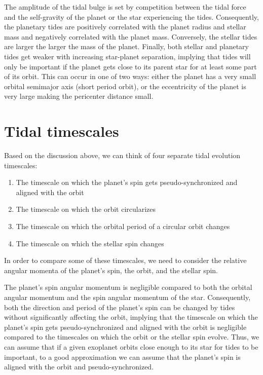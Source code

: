 The amplitude of the tidal bulge is set by competition between the tidal force
and the self-gravity of the planet or the star experiencing the tides.
Consequently, the planetary tides are positively correlated with the planet
radius and stellar mass and negatively correlated with the planet mass.
Conversely, the stellar tides are larger the larger the mass of the planet.
Finally, both stellar and planetary tides get weaker with increasing
star-planet separation, implying that tides will only be important if the planet
gets close to its parent star for at least some part of its orbit. This can
occur in one of two ways: either the planet has a very small orbital semimajor
axis (short period orbit), or the eccentricity of the planet is very large
making the pericenter distance small.

\section{Tidal timescales}

Based on the discussion above, we can think of four separate tidal evolution
timescales:

\begin{enumerate}
%
    \item The timescale on which the planet's spin gets pseudo-synchronized and
        aligned with the orbit
%
    \item The timescale on which the orbit circularizes
%
    \item The timescale on which the orbital period of a circular orbit changes
%
    \item The timescale on which the stellar spin changes
%
\end{enumerate}

In order to compare some of these timescales, we need to consider the relative
angular momenta of the planet's spin, the orbit, and the stellar spin.

The planet's spin angular momentum is negligible compared to both the orbital
angular momentum and the spin angular momentum of the star.  Consequently, both
the direction and period of the planet's spin can be changed by tides without
significantly affecting the orbit, implying that the timescale on which the
planet's spin gets pseudo-synchronized and aligned with the orbit is negligible
compared to the timescales on which the orbit or the stellar spin evolve. Thus,
we can assume that if a given exoplanet orbits close enough to its star for
tides to be important, to a good approximation we can assume that the planet's
spin is aligned with the orbit and pseudo-synchronized.

